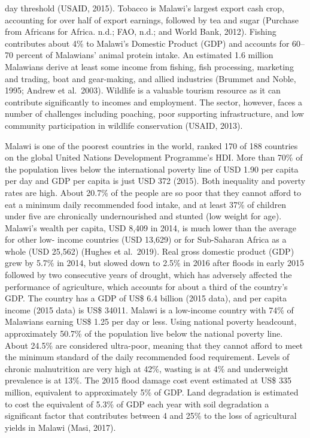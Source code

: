 \documentclass[
]{book}
\begin{document}
day threshold (USAID, 2015). Tobacco is Malawi's largest export cash crop, accounting for over half of export earnings, followed by tea and sugar (Purchase from
Africans for Africa. n.d.; FAO, n.d.; and World Bank, 2012). Fishing contributes about 4\% to Malawi's Domestic Product (GDP) and accounts for 60--70 percent of
Malawians' animal protein intake. An estimated 1.6 million Malawians derive at least some income from fishing, fish processing, marketing and trading, boat and
gear-making, and allied industries (Brummet and Noble, 1995; Andrew et al.~2003). Wildlife is a valuable tourism resource as it can contribute significantly to
incomes and employment. The sector, however, faces a number of challenges including poaching, poor supporting infrastructure, and low community participation in
wildlife conservation (USAID, 2013).

Malawi is one of the poorest countries in the world, ranked 170 of 188 countries on the global United Nations Development Programme's HDI. More than 70\% of the
population lives below the international poverty line of USD 1.90 per capita per day and GDP per capita is just USD 372 (2015). Both inequality and poverty rates
are high. About 20.7\% of the people are so poor that they cannot afford to eat a minimum daily recommended food intake, and at least 37\% of children under five
are chronically undernourished and stunted (low weight for age). Malawi's wealth per capita, USD 8,409 in 2014, is much lower than the average for other low-
income countries (USD 13,629) or for Sub-Saharan Africa as a whole (USD 25,562) (Hughes et al.~2019). Real gross domestic product (GDP) grew by 5.7\% in 2014, but
slowed down to 2.5\% in 2016 after floods in early 2015 followed by two consecutive years of drought, which has adversely affected the performance of agriculture,
which accounts for about a third of the country's GDP. The country has a GDP of US\$ 6.4 billion (2015 data), and per capita income (2015 data) is US\$ 34011.
Malawi is a low-income country with 74\% of Malawians earning US\$ 1.25 per day or less. Using national poverty headcount, approximately 50.7\% of the population
live below the national poverty line. About 24.5\% are considered ultra-poor, meaning that they cannot afford to meet the minimum standard of the daily
recommended food requirement. Levels of chronic malnutrition are very high at 42\%, wasting is at 4\% and underweight prevalence is at 13\%. The 2015 flood damage
cost event estimated at US\$ 335 million, equivalent to approximately 5\% of GDP. Land degradation is estimated to cost the equivalent of 5.3\% of GDP each year
with soil degradation a significant factor that contributes between 4 and 25\% to the loss of agricultural yields in Malawi (Masi, 2017).
\end{document}
